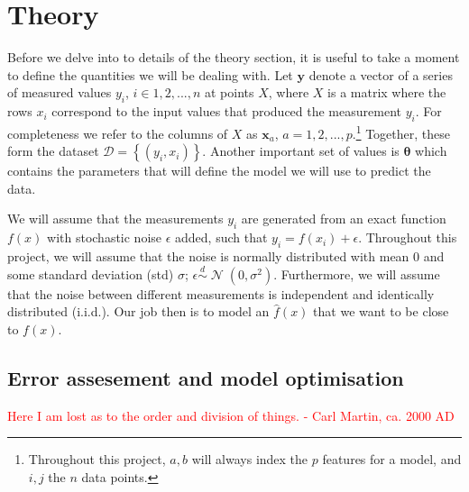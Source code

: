\documentclass[twocolumn,english,notitlepage]{article}
\newcommand{\comment}[1]{\textcolor{red}{#1}}
\renewcommand{\vec}[1]{\boldsymbol{#1}}
\newcommand{\pclosed}[1]{\left(#1\right)}
\newcommand{\cclosed}[1]{\left\{#1\right\}}
\newcommand{\normal}[2]{\operatorname{\mathcal{N}}\pclosed{#1,#2}}
\newcommand{\distas}{\overset{d}{\sim}}
\begin{document}
\section{Theory}
    Before we delve into to details of the theory section, it is useful to take a moment to define the quantities we will be dealing with. Let $\vec{y}$ denote a vector of a series of measured values $y_i$, $i\in 1, 2,..., n$ at points $X$, where $X$ is a matrix where the rows $x_i$ correspond to the input values that produced the measurement $y_i$. For completeness we refer to the columns of $X$ as $\vec{x}_a$, $a=1, 2,..., p$.\footnote{Throughout this project, $a, b$ will always index the $p$ features for a model, and $i, j$ the $n$ data points.} Together, these form the dataset $\mathcal{D} = \cclosed{(y_i, x_i)}$. Another important set of values is $\vec{\theta}$ which contains the parameters that will define the model we will use to predict the data.

    We will assume that the measurements $y_i$ are generated from an exact function $f(x)$ with stochastic noise $\epsilon$ added, such that $y_i = f(x_i) + \epsilon$. Throughout this project, we will assume that the noise is normally distributed with mean 0 and some standard deviation (std) $\sigma$; $\epsilon \distas \normal{0}{\sigma^2}$. Furthermore, we will assume that the noise between different measurements is independent and identically distributed (i.i.d.). Our job then is to model an $\hat{f}(x)$ that we want to be close to $f(x)$.

    \subsection{Error assesement and model optimisation}

    \comment{Here I am lost as to the order and division of things. - Carl Martin, ca. 2000 AD}
\end{document}
